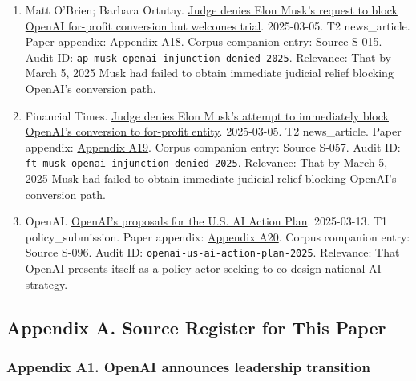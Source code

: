 \documentclass[
  american,
  11pt,
  letterpaper,
]{article}
\begin{document}
\begin{enumerate}
  defendants and an active procedural history.
\item
  Matt O'Brien; Barbara Ortutay.
  \href{https://apnews.com/article/elon-musk-openai-lawsuit-f5724e7ab07b5bed8292a1e8aa2ef695}{Judge
  denies Elon Musk's request to block OpenAI for-profit conversion but
  welcomes trial}. 2025-03-05. T2 news\_article. Paper appendix:
  \hyperref[appendix-a18-judge-denies-elon-musk-s-request-to-block-openai-for-profit-conversion-but-welcomes-trial]{Appendix
  A18}. Corpus companion entry: Source S-015. Audit ID:
  \texttt{ap-musk-openai-injunction-denied-2025}. Relevance: That by
  March 5, 2025 Musk had failed to obtain immediate judicial relief
  blocking OpenAI's conversion path.
\item
  Financial Times.
  \href{https://www.ft.com/content/532931dd-e1c0-4f18-a8af-5777dd70a52d}{Judge
  denies Elon Musk's attempt to immediately block OpenAI's conversion to
  for-profit entity}. 2025-03-05. T2 news\_article. Paper appendix:
  \hyperref[appendix-a19-judge-denies-elon-musks-attempt-to-immediately-block-openais-conversion-to-for-profit-entity]{Appendix
  A19}. Corpus companion entry: Source S-057. Audit ID:
  \texttt{ft-musk-openai-injunction-denied-2025}. Relevance: That by
  March 5, 2025 Musk had failed to obtain immediate judicial relief
  blocking OpenAI's conversion path.
\item
  OpenAI.
  \href{https://openai.com/global-affairs/openai-proposals-for-the-us-ai-action-plan/}{OpenAI's
  proposals for the U.S. AI Action Plan}. 2025-03-13. T1
  policy\_submission. Paper appendix:
  \hyperref[appendix-a20-openais-proposals-for-the-us-ai-action-plan]{Appendix
  A20}. Corpus companion entry: Source S-096. Audit ID:
  \texttt{openai-us-ai-action-plan-2025}. Relevance: That OpenAI
  presents itself as a policy actor seeking to co-design national AI
  strategy.
\end{enumerate}

\subsection{Appendix A. Source Register for This
Paper}\label{appendix-a.-source-register-for-this-paper}

\subsubsection{Appendix A1. OpenAI announces leadership
transition}\label{appendix-a1-openai-announces-leadership-transition}
\end{document}
